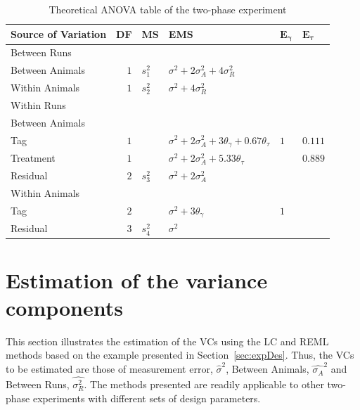 \documentclass[12pt,a4paper]{article}
\begin{document}
\begin{table}[ht]
\centering
\caption{Theoretical ANOVA table of the two-phase experiment}
\begin{tabular}{lrllll} 
\toprule 
\multicolumn{1}{l}{\textbf{Source of Variation}} & \multicolumn{1}{l}{\textbf{DF}}& \multicolumn{1}{l}{\textbf{MS}} & \multicolumn{1}{l}{\textbf{EMS}}& \multicolumn{1}{l}{$\bm{E_{\gamma}}$}&\multicolumn{1}{l}{$\bm{E_{\tau}}$}\\ 
\midrule 
Between Runs & & &  & & \\ 
\quad Between Animals & $1$ &$s_1^2$ & $ \sigma^2+2\sigma_{A}^2+4\sigma_{R}^2$ & & \\ 
\quad Within Animals & $1$ &$s_2^2$& $\sigma^2+4\sigma_{R}^2$ & & \\ \hline 
Within Runs &  &&  & & \\ 
\quad Between Animals &&  &  & & \\ 
\quad \quad Tag & $1$ && $\sigma^2+2\sigma_{A}^2+3\theta_{\gamma}+0.67\theta_{\tau}$ &$1$ & $0.111$\\ 
\quad \quad Treatment & $1$ & & $\sigma^2+2\sigma_{A}^2+5.33\theta_{\tau}$ & & $0.889$\\ 
\quad \quad Residual & $2$ &$s_3^2$& $\sigma^2+2\sigma_{A}^2$ & & \\ \hline 
\quad Within Animals &  &&  & & \\ 
\quad \quad Tag & $2$ && $\sigma^2+3\theta_{\gamma}$ &$1$ & \\ 
\quad \quad Residual & $3$ &$s_4^2$& $\sigma^2$ & & \\ 
\bottomrule 
\end{tabular} 
\label{tab:Phase2ANOVA} 
\end{table} 

\section{Estimation of the variance components}
\label{sec:estVC}
This section illustrates the estimation of the VCs using the LC and REML methods based on the example presented in Section~\ref{sec:expDes}. Thus, the VCs to be estimated are those of measurement error,  $\hat{\sigma}^2$, Between Animals, $\hat{\sigma_A}^2$ and Between Runs, $\hat{\sigma_R^2}$. The methods presented are readily applicable to other two-phase experiments with different sets of design parameters. 
\end{document}
